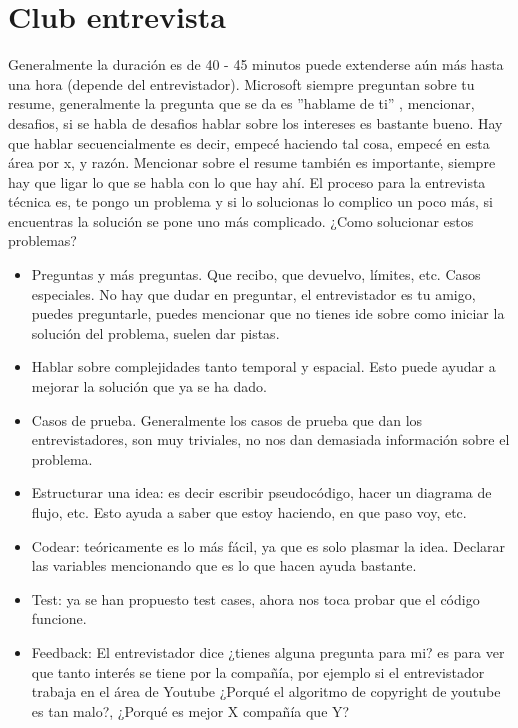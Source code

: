 \chapter{Club entrevista}
Generalmente la duración es de 40 - 45 minutos puede extenderse aún más hasta una hora (depende del entrevistador). Microsoft siempre preguntan sobre tu resume, generalmente la pregunta que se da es ''hablame de ti'' , mencionar, desafios, si se habla de desafios hablar sobre los intereses es bastante bueno. Hay que hablar secuencialmente es decir, empecé haciendo tal cosa, empecé en esta área por x, y razón. Mencionar sobre el \textsf{resume} también es importante, siempre hay que ligar lo que se habla con lo que hay ahí. El proceso para la entrevista técnica es, te pongo un problema y si lo solucionas lo complico un poco más, si encuentras la solución se pone uno más complicado.\newline
¿Como solucionar estos problemas?
\begin{itemize}
    \item {Preguntas y más preguntas. Que recibo, que devuelvo, límites, etc. Casos especiales. No hay que dudar en preguntar, el entrevistador es tu amigo, puedes preguntarle, puedes mencionar que no tienes ide sobre como iniciar la solución del problema, suelen dar pistas.}
    \item {Hablar sobre complejidades tanto temporal y espacial. Esto puede ayudar a mejorar la solución que ya se ha dado.}
    \item {Casos de prueba. Generalmente los casos de prueba que dan los entrevistadores, son muy triviales, no nos dan demasiada información sobre el problema.}
    \item {Estructurar una idea: es decir escribir pseudocódigo, hacer un diagrama de flujo, etc. Esto ayuda a saber que estoy haciendo, en que paso voy, etc.}
    \item {Codear: teóricamente es lo más fácil, ya que es solo plasmar la idea. Declarar las variables mencionando que es lo que hacen ayuda bastante.}
    \item {Test: ya se han propuesto test cases, ahora nos toca probar que el código funcione.}
    \item {Feedback: El entrevistador dice \textsf{¿tienes alguna pregunta para mi?} es para ver que tanto interés se tiene por la compañía, por ejemplo si el entrevistador trabaja en el área de Youtube \textsf{¿Porqué el algoritmo de copyright de youtube es tan malo?, ¿Porqué es mejor X compañía que Y?} }
\end{itemize}

